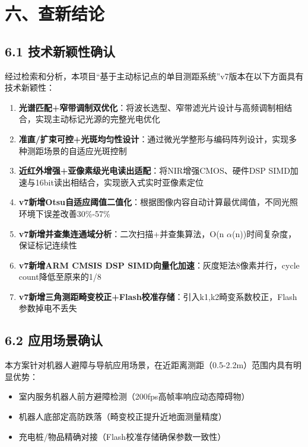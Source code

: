 \documentclass[12pt,a4paper]{article}
\begin{document}
\newpage

\section{六、查新结论}

\subsection{6.1 技术新颖性确认}

经过检索和分析，本项目``基于主动标记点的单目测距系统''v7版本在以下方面具有技术新颖性：

\begin{enumerate}
\item \textbf{光谱匹配+窄带调制双优化}：将波长选型、窄带滤光片设计与高频调制相结合，实现主动标记光源的完整光电优化
\item \textbf{准直/扩束可控+光斑均匀性设计}：通过微光学整形与编码阵列设计，实现多种测距场景的自适应光斑控制
\item \textbf{近红外增强+亚像素级光电读出适配}：将NIR增强CMOS、硬件DSP SIMD加速与16bit读出相结合，实现嵌入式实时亚像素定位
\item \textbf{v7新增Otsu自适应阈值二值化}：根据图像内容自动计算最优阈值，不同光照环境下误差改善30\%-57\%
\item \textbf{v7新增并查集连通域分析}：二次扫描+并查集算法，O(n $\alpha$(n))时间复杂度，保证标记连续性
\item \textbf{v7新增ARM CMSIS DSP SIMD向量化加速}：灰度矩法8像素并行，cycle count降低至原来的1/8
\item \textbf{v7新增三角测距畸变校正+Flash校准存储}：引入k1,k2畸变系数校正，Flash参数掉电不丢失
\end{enumerate}

\subsection{6.2 应用场景确认}

本方案针对机器人避障与导航应用场景，在近距离测距（0.5-2.2m）范围内具有明显优势：
\begin{itemize}
\item 室内服务机器人前方避障检测（200fps高帧率响应动态障碍物）
\item 机器人底部定高防跌落（畸变校正提升近地面测量精度）
\item 充电桩/物品精确对接（Flash校准存储确保参数一致性）
\end{itemize}
\end{document}
